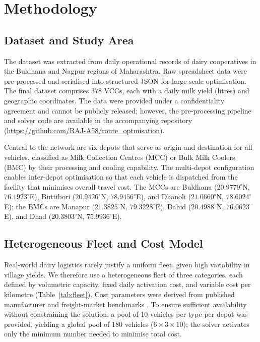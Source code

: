\documentclass{svproc}
\begin{document}
\section{Methodology}
\label{sec2}

\subsection{Dataset and Study Area}
\label{subsec2}

The dataset was extracted from daily operational records of dairy cooperatives in the Buldhana and Nagpur regions of Maharashtra. Raw spreadsheet data were pre-processed and serialised into structured JSON for large-scale optimisation. The final dataset comprises 378 VCCs, each with a daily milk yield (litres) and geographic coordinates. The data were provided under a confidentiality agreement and cannot be publicly released; however, the pre-processing pipeline and solver code are available in the accompanying repository (\url{https://github.com/RAJ-A58/route_optmisation}).

Central to the network are six depots that serve as origin and destination for all vehicles, classified as Milk Collection Centres (MCC) or Bulk Milk Coolers (BMC) by their processing and cooling capability. The multi-depot configuration enables inter-depot optimisation so that each vehicle is dispatched from the facility that minimises overall travel cost. The MCCs are Buldhana ($20.9779^\circ$N, $76.1923^\circ$E), Buttibori ($20.9426^\circ$N, $78.9456^\circ$E), and Dhanoli ($21.0660^\circ$N, $78.6024^\circ$E); the BMCs are Manapur ($21.3825^\circ$N, $79.3228^\circ$E), Dahid ($20.4988^\circ$N, $76.0623^\circ$E), and Dhad ($20.3803^\circ$N, $75.9936^\circ$E).

\subsection{Heterogeneous Fleet and Cost Model}
\label{subsec2_2}

Real-world dairy logistics rarely justify a uniform fleet, given high variability in village yields. We therefore use a heterogeneous fleet of three categories, each defined by volumetric capacity, fixed daily activation cost, and variable cost per kilometre (Table~\ref{tab:fleet}). Cost parameters were derived from published manufacturer and freight-market benchmarks \cite{TataMotors2024,Eicher2024,Vahak2024}. To ensure sufficient availability without constraining the solution, a pool of 10 vehicles per type per depot was provided, yielding a global pool of 180 vehicles ($6\times3\times10$); the solver activates only the minimum number needed to minimise total cost.
\end{document}
